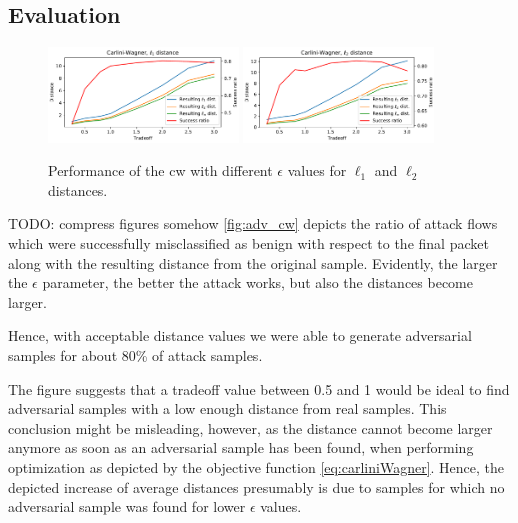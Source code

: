 \documentclass[conference]{IEEEtran}
\newcommand\note[2]{{\color{#1}#2}}
\newcommand\todo[1]{{\note{red}{TODO: #1}}}
\begin{document}
\subsection{Evaluation}
\begin{figure}
\includegraphics[width=0.45\textwidth]{adv_plots/cwl1.pdf}
\includegraphics[width=0.45\textwidth]{adv_plots/cwl2.pdf}
\caption{Performance of the \gls{cw} with different $\epsilon$ values for $\ell_1$ and $\ell_2$ distances.}
\label{fig:adv_cw}
\end{figure}
\todo{compress figures somehow}
\autoref{fig:adv_cw} depicts the ratio of attack flows which were successfully misclassified as benign with respect to the final packet along with the resulting distance from the original sample. Evidently, the larger the $\epsilon$ parameter, the better the attack works, but also the distances become larger.

Hence, with acceptable distance values we were able to generate adversarial samples for about 80\% of attack samples.

The figure suggests that a tradeoff value between 0.5 and 1 would be ideal to find adversarial samples with a low enough distance from real samples. This conclusion might be misleading, however, as the distance cannot become larger anymore as soon as an adversarial sample has been found, when performing optimization as depicted by the objective function \eqref{eq:carliniWagner}. Hence, the depicted increase of average distances presumably is due to samples for which no adversarial sample was found for lower $\epsilon$ values.
\end{document}
